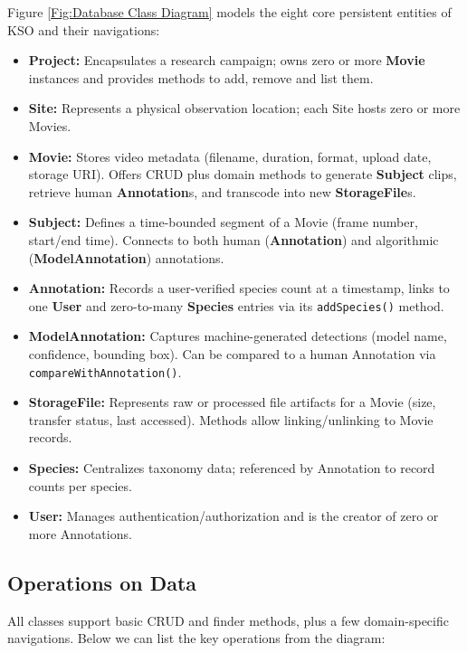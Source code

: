 Figure \ref{Fig:Database Class Diagram} models the eight core persistent entities of KSO and their navigations:
\begin{itemize}[noitemsep,leftmargin=*]
  \item \textbf{Project:}  
    Encapsulates a research campaign; owns zero or more \textbf{Movie} instances and provides methods to add, remove and list them.
  \item \textbf{Site:}  
    Represents a physical observation location; each Site hosts zero or more Movies.
  \item \textbf{Movie:}  
    Stores video metadata (filename, duration, format, upload date, storage URI).  
    Offers CRUD plus domain methods to generate \textbf{Subject} clips, retrieve human \textbf{Annotation}s, and transcode into new \textbf{StorageFile}s.
  \item \textbf{Subject:}  
    Defines a time-bounded segment of a Movie (frame number, start/end time).  
    Connects to both human (\textbf{Annotation}) and algorithmic (\textbf{ModelAnnotation}) annotations.
  \item \textbf{Annotation:}  
    Records a user-verified species count at a timestamp, links to one \textbf{User} and zero-to-many \textbf{Species} entries via its \texttt{addSpecies()} method.
  \item \textbf{ModelAnnotation:}  
    Captures machine-generated detections (model name, confidence, bounding box).  
    Can be compared to a human Annotation via \texttt{compareWithAnnotation()}.
  \item \textbf{StorageFile:}  
    Represents raw or processed file artifacts for a Movie (size, transfer status, last accessed).  
    Methods allow linking/unlinking to Movie records.
  \item \textbf{Species:}  
    Centralizes taxonomy data; referenced by Annotation to record counts per species.
  \item \textbf{User:}  
    Manages authentication/authorization and is the creator of zero or more Annotations.
\end{itemize}

\subsection{Operations on Data}
All classes support basic CRUD and finder methods, plus a few domain-specific navigations. Below we can list the key operations from the diagram:


